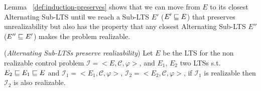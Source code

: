 %
%
%
%

Lemma ~\ref{def:induction-preserves} shows that we can move from $E$ to its closest Alternating Sub-LTS until we reach a Sub-LTS $E'$ ($E' \sqsubseteq E$) that preserves unrealizability but also has the property that any closest Alternating Sub-LTS $E''$ ($E'' \sqsubseteq E'$)  makes the problem realizable.
\begin{lemma}\label{def:induction-preserves}(\emph{Alternating Sub-LTSs preserve realizability})
	Let $E$ be the LTS for the non realizable control problem
	$\mathcal{I}=<E,\mathcal{C}, \varphi>$, and $E_1$, $E_2$ two LTSs s.t. 
	$E_2 \sqsubseteq E_1 \sqsubseteq E$ and
	$\mathcal{I}_1=<E_1, \mathcal{C}, \varphi>$, $\mathcal{I}_2=<E_2, \mathcal{C}, \varphi>$, if $\mathcal{I}_1$ is realizable then $\mathcal{I}_2$ is also realizable.
\end{lemma}

